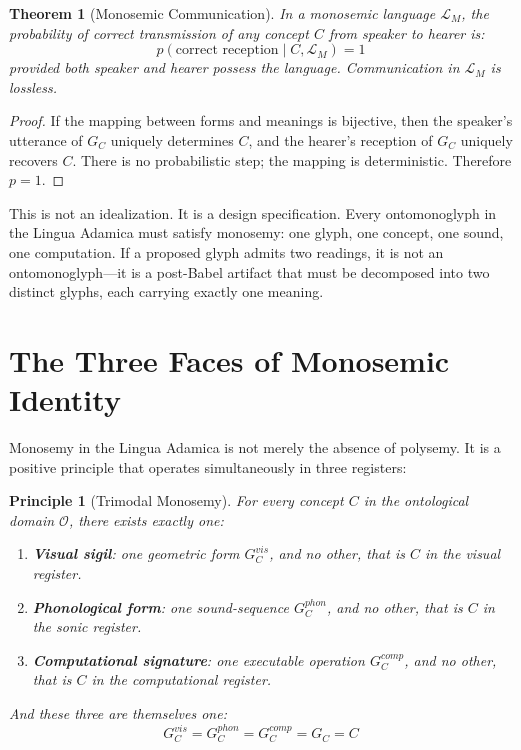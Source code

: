 \documentclass[12pt, letterpaper]{book}
\def\equiv{=}%
\newtheorem{theorem}{Theorem}[chapter]
\newtheorem{principle}{Principle}[chapter]
\begin{document}
\begin{theorem}[Monosemic Communication]\label{thm:monosemic}
In a monosemic language $\mathcal{L}_M$, the probability of correct transmission of any concept $C$ from speaker to hearer is:
\[
p(\text{correct reception} \mid C, \mathcal{L}_M) \equiv 1
\]
provided both speaker and hearer possess the language. Communication in $\mathcal{L}_M$ is lossless.
\end{theorem}

\begin{proof}
If the mapping between forms and meanings is bijective, then the speaker's utterance of $G_C$ uniquely determines $C$, and the hearer's reception of $G_C$ uniquely recovers $C$. There is no probabilistic step; the mapping is deterministic. Therefore $p \equiv 1$.
\end{proof}

This is not an idealization. It is a design specification. Every ontomonoglyph in the Lingua Adamica must satisfy monosemy: one glyph, one concept, one sound, one computation. If a proposed glyph admits two readings, it is not an ontomonoglyph---it is a post-Babel artifact that must be decomposed into two distinct glyphs, each carrying exactly one meaning.


\section{The Three Faces of Monosemic Identity}

Monosemy in the Lingua Adamica is not merely the absence of polysemy. It is a positive principle that operates simultaneously in three registers:

\begin{principle}[Trimodal Monosemy]\label{pr:trimodal-monosemy}
For every concept $C$ in the ontological domain $\mathcal{O}$, there exists exactly one:
\begin{enumerate}[label=(\roman*)]
    \item \textbf{Visual sigil}: one geometric form $G_C^{vis}$, and no other, that \textit{is} $C$ in the visual register.
    \item \textbf{Phonological form}: one sound-sequence $G_C^{phon}$, and no other, that \textit{is} $C$ in the sonic register.
    \item \textbf{Computational signature}: one executable operation $G_C^{comp}$, and no other, that \textit{is} $C$ in the computational register.
\end{enumerate}
And these three are themselves one:
\[
G_C^{vis} \equiv G_C^{phon} \equiv G_C^{comp} \equiv G_C \equiv C
\]
\end{principle}
\end{document}
